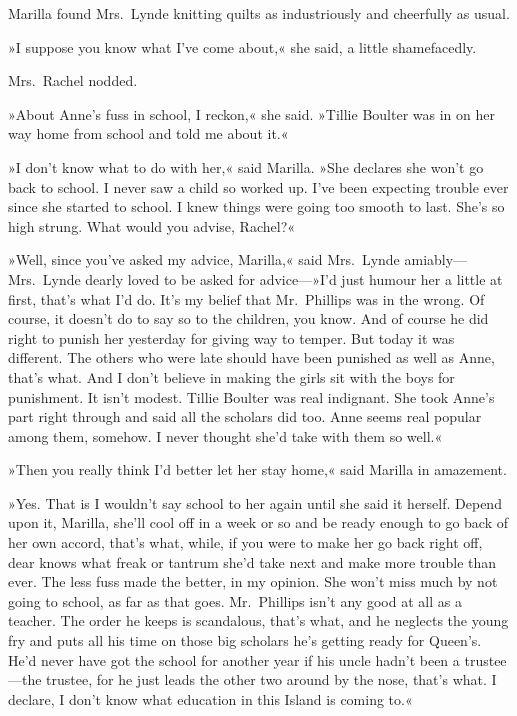 Marilla found Mrs.~Lynde knitting quilts as industriously and cheerfully as usual.

»I suppose you know what I've come about,« she said, a little shamefacedly.

Mrs.~Rachel nodded.

»About Anne's fuss in school, I reckon,« she said. »Tillie Boulter was in on her way home from school and told me about it.«

»I don't know what to do with her,« said Marilla. »She declares she won't go back to school. I never saw a child so worked up. I've been expecting trouble ever since she started to school. I knew things were going too smooth to last. She's so high strung. What would you advise, Rachel?«

»Well, since you've asked my advice, Marilla,« said Mrs.~Lynde amiably—Mrs.~Lynde dearly loved to be asked for advice—»I'd just humour her a little at first, that's what I'd do. It's my belief that Mr.~Phillips was in the wrong. Of course, it doesn't do to say so to the children, you know. And of course he did right to punish her yesterday for giving way to temper. But today it was different. The others who were late should have been punished as well as Anne, that's what. And I don't believe in making the girls sit with the boys for punishment. It isn't modest. Tillie Boulter was real indignant. She took Anne's part right through and said all the scholars did too. Anne seems real popular among them, somehow. I never thought she'd take with them so well.«

»Then you really think I'd better let her stay home,« said Marilla in amazement.

»Yes. That is I wouldn't say school to her again until she said it herself. Depend upon it, Marilla, she'll cool off in a week or so and be ready enough to go back of her own accord, that's what, while, if you were to make her go back right off, dear knows what freak or tantrum she'd take next and make more trouble than ever. The less fuss made the better, in my opinion. She won't miss much by not going to school, as far as that goes. Mr.~Phillips isn't any good at all as a teacher. The order he keeps is scandalous, that's what, and he neglects the young fry and puts all his time on those big scholars he's getting ready for Queen's. He'd never have got the school for another year if his uncle hadn't been a trustee—the trustee, for he just leads the other two around by the nose, that's what. I declare, I don't know what education in this Island is coming to.«

